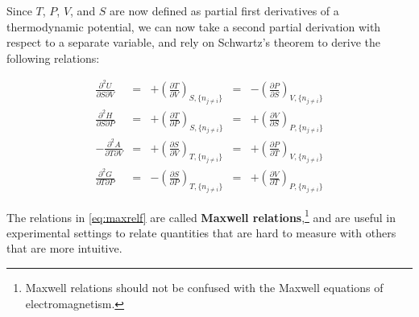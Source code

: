 \documentclass[
  9pt,
]{extbook}
\theoremstyle{definition}
\theoremstyle{definition}
\theoremstyle{definition}
\theoremstyle{definition}
\theoremstyle{remark}
\begin{document}
Since \(T\), \(P\), \(V\), and \(S\) are now defined as partial first derivatives of a thermodynamic potential, we can now take a second partial derivation with respect to a separate variable, and rely on Schwartz's theorem to derive the following relations:

\begin{equation}
\begin{aligned}
\frac{\partial^2 U }{\partial S \partial V} &=& +\left(\frac{\partial T}{\partial V}\right)_{S,\{n_{j \neq i}\}} &=& -\left(\frac{\partial P}{\partial S}\right)_{V,\{n_{j \neq i}\}}   \\
\frac{\partial^2 H }{\partial S \partial P} &=& +\left(\frac{\partial T}{\partial P}\right)_{S,\{n_{j \neq i}\}} &=& +\left(\frac{\partial V}{\partial S}\right)_{P,\{n_{j \neq i}\}}  \\
-\frac{\partial^2 A }{\partial T \partial V} &=& +\left(\frac{\partial S}{\partial V}\right)_{T,\{n_{j \neq i}\}} &=& +\left(\frac{\partial P}{\partial T}\right)_{V,\{n_{j \neq i}\}}  \\
\frac{\partial^2 G }{\partial T \partial P} &=& -\left(\frac{\partial S}{\partial P}\right)_{T,\{n_{j \neq i}\}} &=& +\left(\frac{\partial V}{\partial T}\right)_{P,\{n_{j \neq i}\}}
\end{aligned}
\label{eq:maxrelf}
\end{equation}

The relations in \eqref{eq:maxrelf} are called \textbf{Maxwell relations},\footnote{Maxwell relations should not be confused with the Maxwell equations of electromagnetism.} and are useful in experimental settings to relate quantities that are hard to measure with others that are more intuitive.
\end{document}
